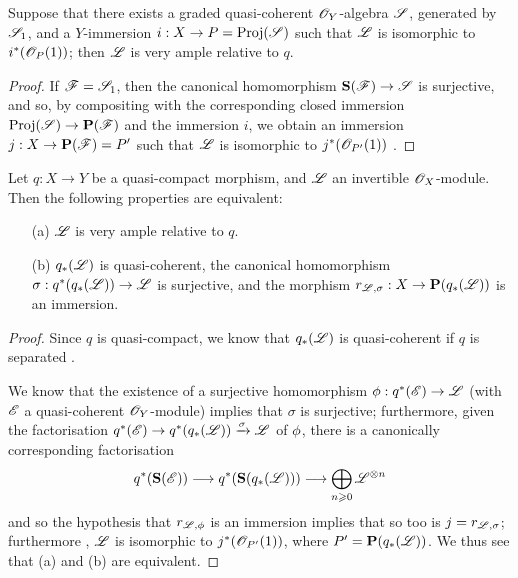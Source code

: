 \begin{corollary}[4.4.3]
\label{II.4.4.3}
Suppose that there exists a graded quasi-coherent $\mathscr{O}_Y$-algebra $\mathscr{S}$, generated by $\mathscr{S}_1$, and a $Y$-immersion $i:X\to P=\Proj(\sh{S})$ such that $\mathscr{L}$ is isomorphic to $i^*(\mathscr{O}_P(1))$;
then $\mathscr{L}$ is very ample relative to $q$.
\end{corollary}

\begin{proof}
If $\mathscr{F}=\mathscr{S}_1$, then the canonical homomorphism $\bb{S}(\sh{F})\to\sh{S}$ is surjective, and so, by compositing with the corresponding closed immersion $\Proj(\sh{S})\to\bb{P}(\sh{F})$  and the immersion $i$, we obtain an immersion $j:X\to\bb{P}(\sh{F})=P'$ such that $\mathscr{L}$ is isomorphic to $j^*(\mathscr{O}_{P'}(1))$ .
\end{proof}

\begin{proposition}[4.4.4]
\label{II.4.4.4}
Let $q:X\to Y$ be a quasi-compact morphism, and $\mathscr{L}$ an invertible $\mathscr{O}_X$-module.
Then the following properties are equivalent:
\begin{enumerate}
  \item[\rm{(a)}] $\mathscr{L}$ is very ample relative to $q$.
  \item[\rm{(b)}] $q_*(\mathscr{L})$ is quasi-coherent, the canonical homomorphism $\sigma:q^*(q_*(\sh{L}))\to\sh{L}$ is surjective, and the morphism $r_{\sh{L},\sigma}:X\to\bb{P}(q_*(\sh{L}))$ is an immersion.
\end{enumerate}
\end{proposition}

\begin{proof}
Since $q$ is quasi-compact, we know that $q_*(\mathscr{L})$ is quasi-coherent if $q$ is separated .

We know  that the existence of a surjective homomorphism $\vphi:q^*(\sh{E})\to\sh{L}$ (with $\mathscr{E}$ a quasi-coherent $\mathscr{O}_Y$-module) implies that $\sigma$ is surjective;
furthermore, given the factorisation $q^*(\sh{E})\to q^*(q_*(\sh{L}))\xrightarrow{\sigma}\sh{L}$ of $\phi$, there is a canonically corresponding factorisation
\[
  q^*(\bb{S}(\sh{E})) \to q^*(\bb{S}(q_*(\sh{L}))) \to \bigoplus_{n\geq0}\sh{L}^{\otimes n}
\]
and so  the hypothesis that $r_{\mathscr{L},\phi}$ is an immersion implies that so too is $j=r_{\mathscr{L},\sigma}$;
furthermore , $\mathscr{L}$ is isomorphic to $j^*(\mathscr{O}_{P'}(1))$, where $P'=\mathbf{P}(q_*(\mathscr{L}))$.
We thus see that (a) and (b) are equivalent.
\end{proof}

